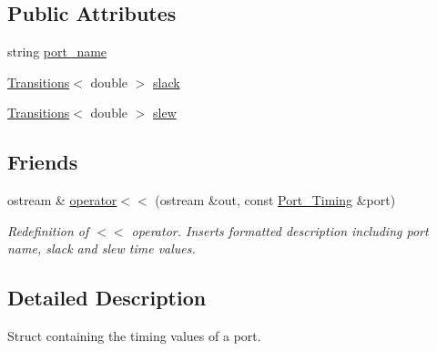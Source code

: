 \subsection*{Public Attributes}
\begin{DoxyCompactItemize}
\item 
string \hyperlink{structPrime__Time__Output__Parser_1_1Port__Timing_a4c7ae6cb0e76db94fe3b03822ead72c4}{port\-\_\-name}
\item 
\hyperlink{classTransitions}{Transitions}$<$ double $>$ \hyperlink{structPrime__Time__Output__Parser_1_1Port__Timing_a21231dfc490477789c81e0c9e3e8c18d}{slack}
\item 
\hyperlink{classTransitions}{Transitions}$<$ double $>$ \hyperlink{structPrime__Time__Output__Parser_1_1Port__Timing_a33e7eb34b63367e3b639999e1cb793bf}{slew}
\end{DoxyCompactItemize}
\subsection*{Friends}
\begin{DoxyCompactItemize}
\item 
ostream \& \hyperlink{structPrime__Time__Output__Parser_1_1Port__Timing_abd555e7dc2c5bfe2b1699915d6b0ca8f}{operator$<$$<$} (ostream \&out, const \hyperlink{structPrime__Time__Output__Parser_1_1Port__Timing}{Port\-\_\-\-Timing} \&port)
\begin{DoxyCompactList}\small\item\em Redefinition of $<$$<$ operator. Inserts formatted description including port name, slack and slew time values. \end{DoxyCompactList}\end{DoxyCompactItemize}


\subsection{Detailed Description}
Struct containing the timing values of a port. 

